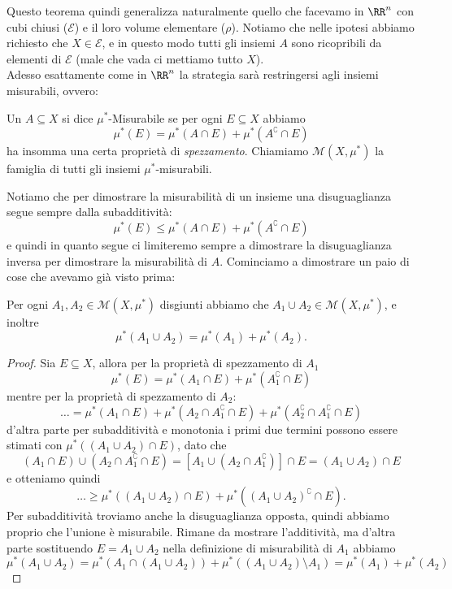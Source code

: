 \documentclass[11pt]{scrartcl}
\begin{document}
	Questo teorema quindi generalizza naturalmente quello che facevamo in $\RR^n$ con cubi chiusi ($\mathcal{E}$) e il loro volume elementare ($\rho$). Notiamo che nelle ipotesi abbiamo richiesto che $X\in \mathcal{E}$, e in questo modo tutti gli insiemi $A$ sono ricopribili da elementi di $\mathcal{E}$ (male che vada ci mettiamo tutto $X$). \\
	Adesso esattamente come in $\RR^n$ la strategia sarà restringersi agli insiemi misurabili, ovvero:
	\begin{definition}[$\mu^*$-Misurabile]
		Un $A\subseteq X$ si dice $\mu^*$-Misurabile se per ogni $E\subseteq X$ abbiamo
		$$\mu^*(E)=\mu^*(A\cap E)+\mu^*\left(A^\complement \cap E\right)$$
		ha insomma una certa proprietà di \textit{spezzamento}. Chiamiamo $\mathcal{M}(X,\mu^*)$ la famiglia di tutti gli insiemi $\mu^*$-misurabili.
	\end{definition}
	Notiamo che per dimostrare la misurabilità di un insieme una disuguaglianza segue sempre dalla subadditività:
	$$\mu^*(E)\le \mu^*\left(A\cap E\right)+\mu^*\left(A^\complement \cap E\right)$$
	e quindi in quanto segue ci limiteremo sempre a dimostrare la disuguaglianza inversa per dimostrare la misurabilità di $A$. Cominciamo a dimostrare un paio di cose che avevamo già visto prima:
	\begin{proposition}
		Per ogni $A_1,A_2\in \mathcal{M}(X,\mu^*)$ disgiunti abbiamo che $A_1\cup A_2\in \mathcal{M}(X,\mu^*)$, e inoltre 
		$$\mu^*(A_1\cup A_2)=\mu^*(A_1)+\mu^*(A_2).$$
	\end{proposition}
	\begin{proof}
		Sia $E\subseteq X$, allora per la proprietà di spezzamento di $A_1$
		$$\mu^*(E)=\mu^*(A_1\cap E)+\mu^*(A_1^\complement \cap E)$$
		mentre per la proprietà di spezzamento di $A_2$:
		$$\dots=\mu^*(A_1\cap E)+\mu^*\left(A_2\cap A_1^\complement \cap E\right)+\mu^*\left(A_2^\complement\cap A_1^\complement\cap E\right)$$
		d'altra parte per subadditività e monotonia i primi due termini possono essere stimati con $\mu^*(\left(A_1\cup A_2\right)\cap E)$, dato che
		$$\left(A_1\cap E\right)\cup \left(A_2\cap A_1^\complement\cap E\right)=\left[A_1\cup \left(A_2\cap A_1^\complement\right)\right]\cap E=\left(A_1\cup A_2\right)\cap E$$
		e otteniamo quindi
		$$\dots \ge \mu^*\left(\left(A_1\cup A_2\right)\cap E\right)+\mu^*\left(\left(A_1\cup A_2\right)^\complement \cap E\right).$$ 
		Per subadditività troviamo anche la disuguaglianza opposta, quindi abbiamo proprio che l'unione è misurabile. Rimane da mostrare l'additività, ma d'altra parte sostituendo $E=A_1\cup A_2$ nella definizione di misurabilità di $A_1$ abbiamo
		$$\mu^*(A_1\cup A_2)=\mu^*\left(A_1\cap \left(A_1\cup A_2\right)\right)+\mu^*\left(\left(A_1\cup A_2\right)\setminus A_1\right)=\mu^*\left(A_1\right)+\mu^*\left(A_2\right)$$
	\end{proof}
\end{document}
